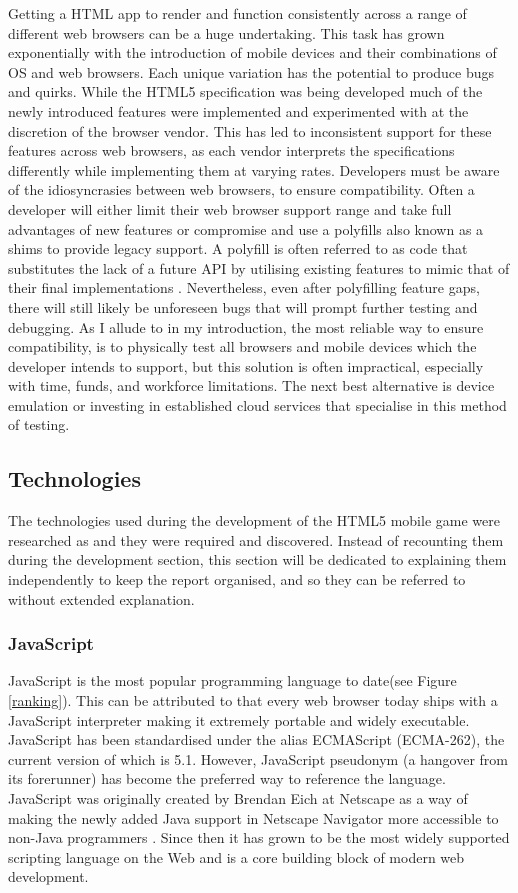 \documentclass[final]{cmpreport}
\begin{document}
Getting a HTML app to render and function consistently across a range of different web browsers can be a huge undertaking. This task has grown exponentially with the introduction of mobile devices and their combinations of OS and web browsers. Each unique variation has the potential to produce bugs and quirks. While the HTML5 specification was being developed much of the newly introduced features were implemented and experimented with at the discretion of the browser vendor. This has led to inconsistent support for these features across web browsers, as each vendor interprets the specifications differently while implementing them at varying rates. Developers must be aware of the idiosyncrasies between web browsers, to ensure compatibility. Often a developer will either limit their web browser support range and take full advantages of new features or compromise and use a polyfills also known as a shims to provide legacy support. A polyfill is often referred to as code that substitutes the lack of a future API by utilising existing features to mimic that of their final implementations \cite{Lawson}. Nevertheless, even after polyfilling feature gaps, there will still likely be unforeseen bugs that will prompt further testing and debugging. As I allude to in my introduction, the most reliable way to ensure compatibility, is to physically test all browsers and mobile devices which the developer intends to support, but this solution is often impractical, especially with time, funds, and workforce limitations. The next best alternative is device emulation or investing in established cloud services that specialise in this method of testing.

\subsection{Technologies}
The technologies used during the development of the HTML5 mobile game were researched as and they were required and discovered. Instead of recounting them during the development section, this section will be dedicated to explaining them independently to keep the report organised, and so they can be referred to without extended explanation.

\subsubsection{JavaScript}
JavaScript is the most popular programming language to date\footnotemark (see Figure \ref{ranking}). This can be attributed to that every web browser today ships with a JavaScript interpreter making it extremely portable and widely executable. JavaScript has been standardised under the alias ECMAScript (ECMA-262), the current version of which is 5.1\footnotemark. However, JavaScript pseudonym (a hangover from its forerunner) has become the preferred way to reference the language. JavaScript was originally created by Brendan Eich at Netscape as a way of making the newly added Java support in Netscape Navigator more accessible to non-Java programmers \citep{Champeon}. Since then it has grown to be the most widely supported scripting language on the Web and is a core building block of modern web development.
\end{document}

